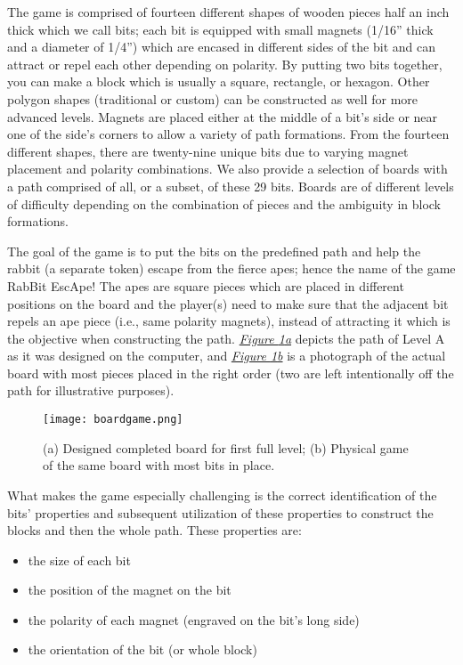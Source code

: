 \documentclass{acm_proc_article-sp}
\begin{document}
The game is comprised of fourteen different shapes of wooden pieces half an inch thick which we call bits; each bit is equipped with small magnets (1/16'' thick and a diameter of 1/4'') which are encased in different sides of the bit and can attract or repel each other depending on polarity.
By putting two bits together, you can make a block which is usually a square, rectangle, or hexagon.
Other polygon shapes (traditional or custom) can be constructed as well for more advanced levels. Magnets are placed either at the middle of a bit's side or near one of the side's corners to allow a variety of path formations.
From the fourteen different shapes, there are twenty-nine unique bits due to varying magnet placement and polarity combinations. We also provide a selection of boards with a path comprised of all, or a subset, of these 29 bits.
Boards are of different levels of difficulty depending on the combination of pieces and the ambiguity in block formations.

The goal of the game is to put the bits on the predefined path and help the rabbit (a separate token) escape from the fierce apes; hence the name of the game RabBit EscApe!
The apes are square pieces which are placed in different positions on the board and the player(s) need to make sure that the adjacent bit repels an ape piece (i.e., same polarity magnets), instead of attracting it which is the objective when constructing the path. 
{\em \hyperref[fig:board-game]{Figure \ref{fig:board-game}a}} depicts the path of Level A as it was designed on the computer, and {\em \hyperref[fig:board-game]{Figure \ref{fig:board-game}b}} is a photograph of the actual board with most pieces placed in the right order (two are left intentionally off the path for illustrative purposes).
\begin{figure}
  \texttt{[image: boardgame.png]}
  \caption{ (a) Designed completed board for first full level; (b) Physical game of the same board with most bits in place. }
  \label{fig:board-game}
\end{figure}

What makes the game especially challenging is the correct identification of the bits' properties and subsequent utilization of these properties to construct the blocks and then the whole path. These properties are:
\begin{itemize}
  \item{the size of each bit}
  \item{the position of the magnet on the bit}
  \item{the polarity of each magnet (engraved on the bit's long side)}
  \item{the orientation of the bit (or whole block)}
\end{itemize}
\end{document}
